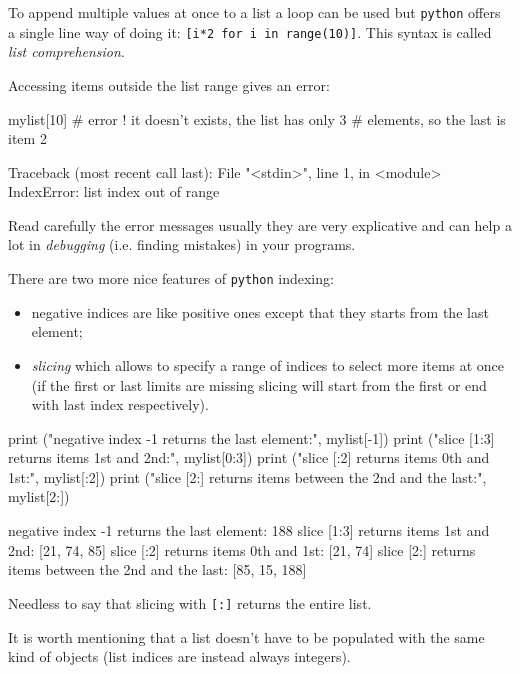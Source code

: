 To append multiple values at once to a list a loop can be used but \texttt{python} offers a single line way of doing it: \texttt{[i*2 for i in range(10)]}. This syntax is called \emph{list comprehension}.

Accessing items outside the list range gives an error:

\begin{ipython}
mylist[10] # error ! it doesn't exists, the list has only 3
           # elements, so the last is item 2
\end{ipython}
\begin{ioutput}
Traceback (most recent call last):
  File "<stdin>", line 1, in <module>
IndexError: list index out of range
\end{ioutput}

Read carefully the error messages usually they are very explicative and can help a lot 
in \emph{debugging} (i.e. finding mistakes) in your programs.

There are two more nice features of \texttt{python} indexing:

\begin{itemize}
\tightlist
\item negative indices are like positive ones except that they starts from the last element;
\item \emph{slicing} which allows to specify a range of indices to select more items at once 
(if the first or last limits are missing slicing will start from the first or end 
with last index respectively).
\end{itemize}

\begin{ipython}
print ("negative index -1 returns the last element:", mylist[-1])
print ("slice [1:3] returns items 1st and 2nd:", mylist[0:3])
print ("slice [:2] returns items 0th and 1st:", mylist[:2])
print ("slice [2:] returns items between the 2nd and the last:", mylist[2:])
\end{ipython}
\begin{ioutput}
negative index -1 returns the last element: 188
slice [1:3] returns items 1st and 2nd: [21, 74, 85]
slice [:2] returns items 0th and 1st: [21, 74]
slice [2:] returns items between the 2nd and the last: [85, 15, 188]
\end{ioutput}
\noindent
Needless to say that slicing with \texttt{[:]} returns the entire list.

It is worth mentioning that a list doesn't have to be populated with the same kind of objects (list indices are instead always integers).

